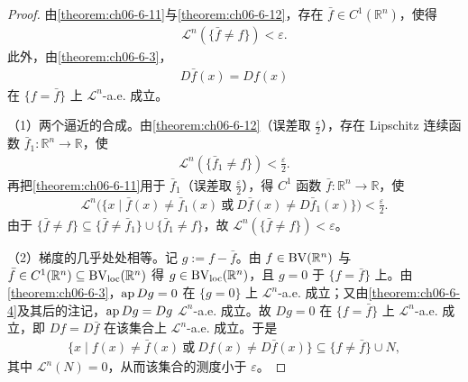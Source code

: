 \documentclass[../../main.tex]{subfiles}%
\begin{document}
\begin{proof}
由\cref{theorem:ch06-6-11}与\cref{theorem:ch06-6-12}，存在 $\bar f\in C^1(\mathbb{R}^n)$，使得%
\begin{align*}
\mathcal{L}^n(\{\bar f\ne f\})<\varepsilon .
\end{align*}
此外，由\cref{theorem:ch06-6-3}，%
\begin{align*}
D\bar f(x)=Df(x)
\end{align*}
在 $\{f=\bar f\}$ 上 $\mathcal{L}^n$-a.e. 成立。

（1）两个逼近的合成。由\cref{theorem:ch06-6-12}（误差取 $\frac{\varepsilon}{2}$），存在 Lipschitz 连续函数 $\bar f_1:\mathbb{R}^n\to\mathbb{R}$，使%
\begin{align*}
\mathcal{L}^n(\{\bar f_1\ne f\})<\frac{\varepsilon}{2}.
\end{align*}
再把\cref{theorem:ch06-6-11}用于 $\bar f_1$（误差取 $\frac{\varepsilon}{2}$），得 $C^1$ 函数 $\bar f:\mathbb{R}^n\to\mathbb{R}$，使%
\begin{align*}
\mathcal{L}^n\bigl(\{x\mid\bar f(x)\ne\bar f_1(x)\ \text{或}\ D\bar f(x)\ne D\bar f_1(x)\}\bigr)<\frac{\varepsilon}{2}.
\end{align*}
由于 $\{\bar f\ne f\}\subseteq\{\bar f\ne\bar f_1\}\cup\{\bar f_1\ne f\}$，故 $\mathcal{L}^n(\{\bar f\ne f\})<\varepsilon$。

（2）梯度的几乎处处相等。记 $g:=f-\bar f$。由 $f\in\mathrm{BV}(\mathbb{R}^n)$ 与 $\bar f\in C^1(\mathbb{R}^n)\subseteq\mathrm{BV}_{\mathrm{loc}}(\mathbb{R}^n)$ 得 $g\in\mathrm{BV}_{\mathrm{loc}}(\mathbb{R}^n)$，且 $g=0$ 于 $\{f=\bar f\}$ 上。由\cref{theorem:ch06-6-3}，$\operatorname{ap} Dg=0$ 在 $\{g=0\}$ 上 $\mathcal{L}^n$-a.e. 成立；又由\cref{theorem:ch06-6-4}及其后的注记，$\operatorname{ap} Dg=Dg$ $\mathcal{L}^n$-a.e. 成立。故 $Dg=0$ 在 $\{f=\bar f\}$ 上 $\mathcal{L}^n$-a.e. 成立，即 $Df=D\bar f$ 在该集合上 $\mathcal{L}^n$-a.e. 成立。于是%
\begin{align*}
\{x\mid f(x)\ne\bar f(x)\ \text{或}\ Df(x)\ne D\bar f(x)\}\subseteq\{f\ne\bar f\}\cup N,
\end{align*}
其中 $\mathcal{L}^n(N)=0$，从而该集合的测度小于 $\varepsilon$。%
\end{proof}
\end{document}
